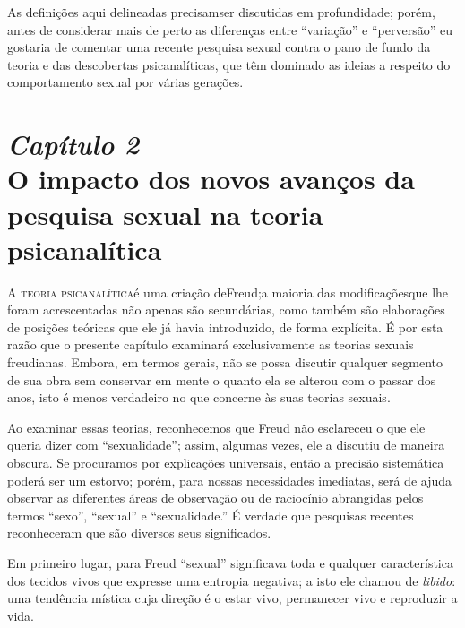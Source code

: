 As definições aqui delineadas precisam\idxpervdiagn[|)] ser discutidas em
profundidade; porém, antes de considerar mais de perto as diferenças
entre ``variação'' e ``perversão'' eu gostaria de comentar uma
recente pesquisa sexual contra o pano de fundo da teoria e das
descobertas psicanalíticas, que têm dominado as ideias a respeito do
comportamento sexual por várias gerações.




\chapter[\textbf{2}\quad O impacto dos novos avanços da pesquisa sexual\\\hspace*{6mm}
na teoria psicanalítica]{{\large\textit{Capítulo 2}}\\ O impacto dos novos avanços da pesquisa sexual na teoria psicanalítica}

\textsc{A teoria psicanalítica}\idxsexop[|(] é uma criação de\idxfreudsexua[|(] Freud;\idxfreud[|(] a maioria das
modificações\idxsexuateo[|(] que lhe foram acrescentadas não apenas são secundárias,
como também são elaborações de posições teóricas que ele já havia
introduzido, de forma explícita. É por esta razão que o presente
capítulo examinará exclusivamente as teorias sexuais freudianas.
Embora, em termos gerais, não se possa discutir qualquer segmento de
sua obra sem conservar em mente o quanto ela se alterou com o passar
dos anos, isto é menos verdadeiro no que concerne às suas teorias sexuais.

 Ao examinar essas teorias, reconhecemos que Freud não esclareceu o que
ele queria dizer com ``sexualidade''; assim,
algumas vezes, ele a discutiu de maneira obscura. Se procuramos por
explicações universais, então a precisão sistemática poderá ser um
estorvo; porém, para nossas necessidades imediatas, será de ajuda
observar as diferentes áreas de observação ou de raciocínio abrangidas
pelos termos ``sexo'', ``sexual'' e ``sexualidade.'' É verdade que pesquisas
recentes reconheceram que são diversos seus significados.

 Em primeiro lugar, para Freud ``sexual'' significava toda e qualquer característica dos tecidos vivos que
expresse uma entropia negativa; a isto ele chamou de \textit{libido}:\idxlibid{}
uma tendência mística cuja direção é o estar vivo, permanecer vivo e
reproduzir a vida.


